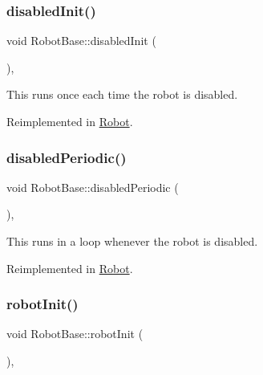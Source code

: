\subsubsection{\texorpdfstring{disabledInit()}{disabledInit()}}
{\footnotesize\ttfamily void Robot\+Base\+::disabled\+Init (\begin{DoxyParamCaption}{ }\end{DoxyParamCaption})\hspace{0.3cm}{\ttfamily [protected]}, {\ttfamily [virtual]}}

This runs once each time the robot is disabled. 

Reimplemented in \mbox{\hyperlink{class_robot_a34f8bfa41ab64deae701c5583f619e78}{Robot}}.

\mbox{\label{classlib_iterative_robot_1_1_robot_base_a8e1e85e215343baaaf3bdeedb89d9890}} 
\subsubsection{\texorpdfstring{disabledPeriodic()}{disabledPeriodic()}}
{\footnotesize\ttfamily void Robot\+Base\+::disabled\+Periodic (\begin{DoxyParamCaption}{ }\end{DoxyParamCaption})\hspace{0.3cm}{\ttfamily [protected]}, {\ttfamily [virtual]}}

This runs in a loop whenever the robot is disabled. 

Reimplemented in \mbox{\hyperlink{class_robot_a9d35b3c9b4de467c7435d0cc6f17b33b}{Robot}}.

\mbox{\label{classlib_iterative_robot_1_1_robot_base_a1e690e472e901ac99bb7ce6f3b6a33ea}} 
\subsubsection{\texorpdfstring{robotInit()}{robotInit()}}
{\footnotesize\ttfamily void Robot\+Base\+::robot\+Init (\begin{DoxyParamCaption}{ }\end{DoxyParamCaption})\hspace{0.3cm}{\ttfamily [protected]}, {\ttfamily [virtual]}}

